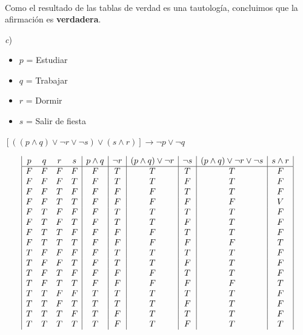 \documentclass[11pt,a4paper]{article}
\begin{document}
\begin{enumerate}
\begin{displaymath}
\begin{array}{|c|}
\end{array}
\end{displaymath}

Como el resultado de las tablas de verdad es una tautología, concluimos que la afirmación es \textbf{verdadera}. 

\vspace{0.5cm}

\textit{c})

\begin{itemize}
\item $p$ = Estudiar
\item $q$ = Trabajar
\item $r$ = Dormir
\item  $s$ = Salir de fiesta
\end{itemize}

\begin{center}

$[((p \wedge q) \vee \neg r \vee \neg s) \vee (s \wedge r)] \rightarrow \neg p \vee \neg q$

\end{center}



\begin{displaymath}
\begin{array}{|c c c c|c|c|c|c|c|c|}
p & q & r & s & p\wedge q & \neg r & (p \wedge q) \vee \neg r & \neg s & (p \wedge q) \vee \neg r \vee \neg s & s \wedge r \\
\hline 
F & F & F & F & F & T & T & T & T & F\\
F & F & F & T & F & T & T & F & T & F\\
F & F & T & F & F & F & F & T & T & F\\
F & F & T & T & F & F & F & F & F & V\\
F & T & F & F & F & T & T & T & T & F\\
F & T & F & T & F & T & T & F & T & F\\
F & T & T & F & F & F & F & T & T & F\\
F & T & T & T & F & F & F & F & F & T\\
T & F & F & F & F & T & T & T & T & F\\
T & F & F & T & F & T & T & F & T & F\\
T & F & T & F & F & F & F & T & T & F\\
T & F & T & T & F & F & F & F & F & T\\
T & T & F & F & T & T & T & T & T & F\\
T & T & F & T & T & T & T & F & T & F\\
T & T & T & F & T & F & T & T & T & F\\
T & T & T & T & T & F & T & F & T & T\\
\end{array}
\end{displaymath}


\end{enumerate}
\end{document}
